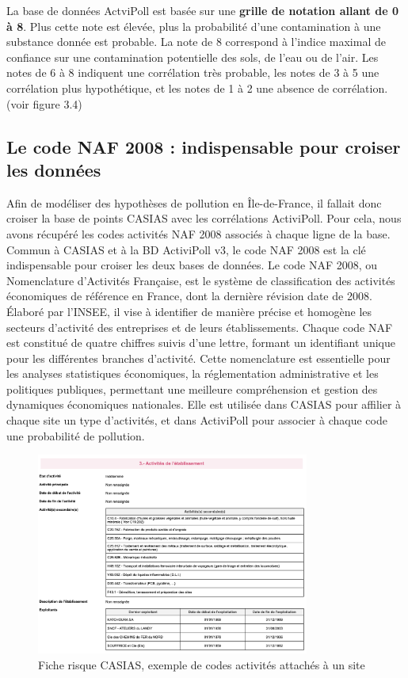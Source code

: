 \documentclass[a4paper,twoside,12pt]{book}
\begin{document}
La base de données ActviPoll est basée sur une \textbf{grille de notation allant de 0 à 8}. Plus cette note est élevée, plus la probabilité d'une contamination à une substance donnée est probable. La note de 8 correspond à l'indice maximal de confiance sur une contamination potentielle des sols, de l'eau ou de l'air. Les notes de 6 à 8 indiquent une corrélation très probable, les notes de 3 à 5 une corrélation plus hypothétique, et les notes de 1 à 2 une absence de corrélation. (voir figure 3.4)

\subsection{Le code NAF 2008 : indispensable pour croiser les données}

Afin de modéliser des hypothèses de pollution en Île-de-France, il fallait donc croiser la base de points CASIAS avec les corrélations ActiviPoll. Pour cela, nous avons récupéré les codes activités NAF 2008 associés à chaque ligne de la base. Commun à CASIAS et à la BD ActiviPoll v3, le code NAF 2008 est la clé indispensable pour croiser les deux bases de données. Le code NAF 2008, ou Nomenclature d'Activités Française, est le système de classification des activités économiques de référence en France, dont la dernière révision date de 2008. Élaboré par l'INSEE, il vise à identifier de manière précise et homogène les secteurs d'activité des entreprises et de leurs établissements. Chaque code NAF est constitué de quatre chiffres suivis d'une lettre, formant un identifiant unique pour les différentes branches d'activité. Cette nomenclature est essentielle pour les analyses statistiques économiques, la réglementation administrative et les politiques publiques, permettant une meilleure compréhension et gestion des dynamiques économiques nationales. Elle est utilisée dans CASIAS pour affilier à chaque site un type d'activités, et dans ActiviPoll pour associer à chaque code une probabilité de pollution. 

\begin{figure}[!h]
\centering 
\includegraphics[width=0.8\textwidth]{img/chapitre3/CASIAS_FICHE_RISQUE_ZOOM_NAF2008}
\caption{Fiche risque CASIAS, exemple de codes activités attachés à un site}
\end{figure}
        
\end{document}
